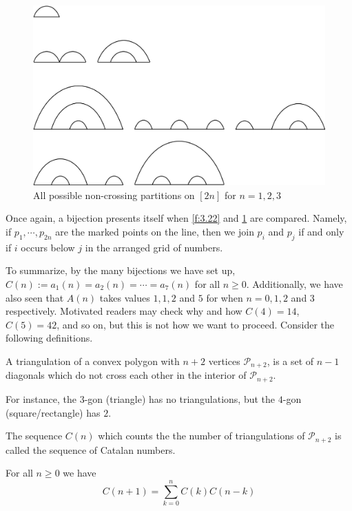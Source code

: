 \begin{solution}
\begin{figure}[H]
    \centering
    \includegraphics[width=0.8\linewidth]{Images/Figure15.png}
    \caption{All possible non-crossing partitions on $[2n]$ for $n=1,2,3$}
    \label{f:3.25}
\end{figure}
Once again, a bijection presents itself when \cref{f:3.22} and \cref{f:3.25} are compared. Namely, if $p_1,\cdots,p_{2n}$ are the marked points on the line, then we join $p_i$ and $p_j$ if and only if $i$ occurs below $j$ in the arranged grid of numbers. 
\end{solution}
To summarize, by the many bijections we have set up, $C(n):=a_1(n)=a_2(n)=\cdots=a_7(n)$ for all $n\geq 0$. Additionally, we have also seen that $A(n)$ takes values $1,1,2$ and $5$ for when $n=0,1,2$ and $3$ respectively. Motivated readers may check why and how $C(4)=14$, $C(5)=42$, and so on, but this is not how we want to proceed. Consider the following definitions.
\begin{definition}[Triangulation]
A triangulation of a convex polygon with $n+2$ vertices $\mathcal{P}_{n+2}$, is a set of $n-1$ diagonals which do not cross each other in the interior of $\mathcal{P}_{n+2}$. 
\end{definition}
\begin{remark}
For instance, the $3$-gon (triangle) has no triangulations, but the $4$-gon (square/rectangle) has $2$.    
\end{remark}
\begin{definition}
The sequence $C(n)$ which counts the the number of triangulations of $\mathcal{P}_{n+2}$ is called the sequence of Catalan numbers.
\label{d:catalan}
\end{definition}
\begin{theorem}
For all $n\geq 0$ we have
\[
C(n+1) = \sum_{k=0}^{n}C(k)C(n-k)
\]
\label{t:segner}
\end{theorem}
